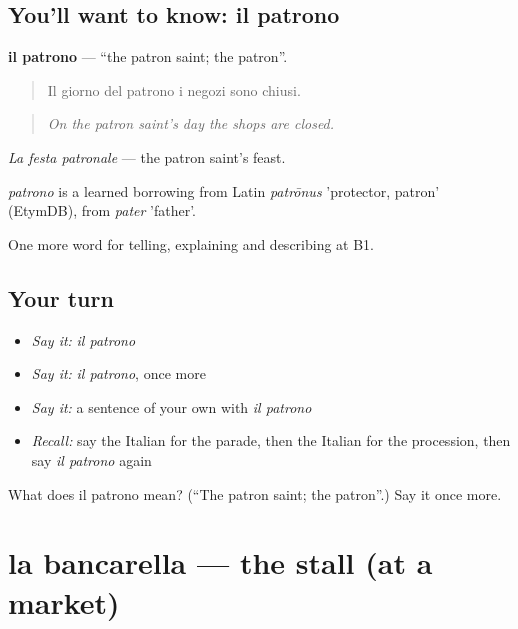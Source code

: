 \subsection*{You'll want to know: il patrono}
\textbf{il patrono} — \textquotedblleft{}the patron saint; the patron\textquotedblright{}.

\begin{quote}
Il giorno del patrono i negozi sono chiusi.
\end{quote}

\begin{quote}
\emph{On the patron saint's day the shops are closed.}
\end{quote}

\emph{La festa patronale} — the patron saint's feast.

\begin{cousinweb}
\emph{patrono} is a learned borrowing from Latin \emph{patrōnus} 'protector, patron' (EtymDB), from \emph{pater} 'father'.
\end{cousinweb}

\begin{grammarlens}[title={What you've built}]
One more word for telling, explaining and describing at B1.
\end{grammarlens}

\subsection*{Your turn}
\begin{itemize}
\raggedright
  \item \emph{Say it:} \emph{il patrono}
  \item \emph{Say it:} \emph{il patrono}, once more
  \item \emph{Say it:} a sentence of your own with \emph{il patrono}
  \item \emph{Recall:} say the Italian for the parade, then the Italian for the procession, then say \emph{il patrono} again
\end{itemize}

\begin{tcolorbox}[breakable,colback=teal!4,colframe=teal!35!black,title={Before you move on}]
What does il patrono mean? (\textquotedblleft{}The patron saint; the patron\textquotedblright{}.) Say it once more.
\end{tcolorbox}
\section[la bancarella]{la bancarella — the stall (at a market)}


